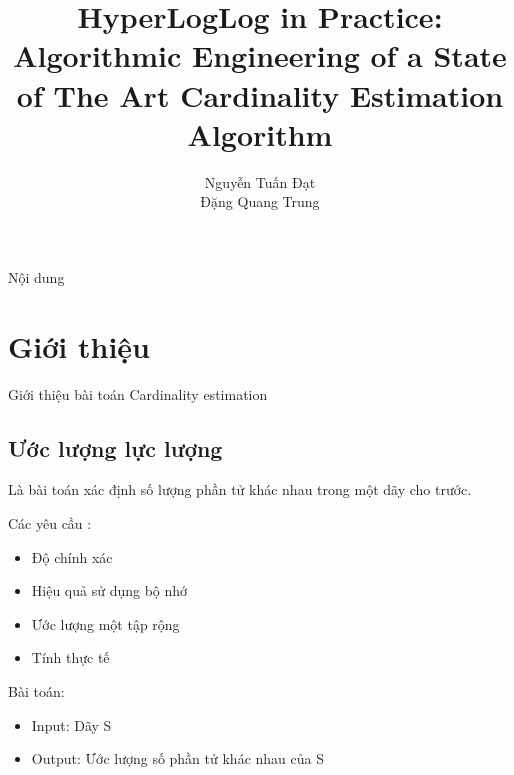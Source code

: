 \documentclass{beamer}
\title[]{{\bf \large HyperLogLog in Practice: Algorithmic Engineering of a
State of The Art Cardinality Estimation Algorithm } \\
}
\author[]{
Nguyễn Tuấn Đạt \\%
Đặng Quang Trung%
}
\institute[]{

}
\begin{document}
\begin{frame}
\titlepage
\end{frame}

\begin{frame}{Nội dung}
\tableofcontents
\end{frame}
\section{Giới thiệu}

\begin{frame}{Giới thiệu bài toán Cardinality estimation}
\subsection{Ước lượng lực lượng}
Là bài toán xác định số lượng phần tử khác nhau trong một dãy cho trước. 

Các yêu cầu :
\begin{itemize}
\item Độ chính xác
\item Hiệu quả sử dụng bộ nhớ
\item Ước lượng một tập rộng
\item Tính thực tế
\end{itemize}

\end{frame}
\begin{frame}
\color{hilight} Bài toán: 
\begin{itemize}
\item Input: Dãy S
\item Output: Ước lượng số phần tử khác nhau của S
\end{itemize}
\end{frame}
\end{document}
